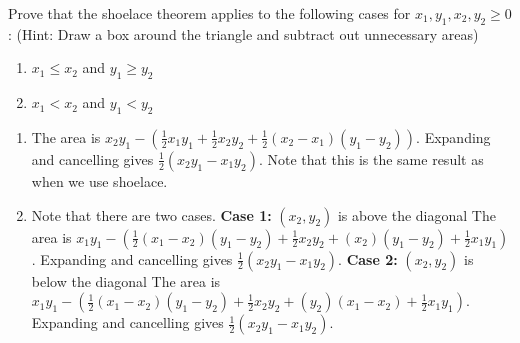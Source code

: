 \documentclass[11pt]{article}
\begin{document}
\begin{problem} \normalfont Prove that the shoelace theorem applies to the following cases for $x_1, y_1, x_2, y_2 \geq 0$: (Hint: Draw a box around the triangle and subtract out unnecessary areas)
\end{problem}
\phantom{blahbity blah} 
\begin{multicols}{2}
\begin{enumerate}[label=(\alph*)]
\item $x_1 \leq x_2$ and $y_1 \geq y_2$
    \newline
\item $x_1 < x_2$ and $y_1 < y_2$
    \newline
\end{enumerate}
\end{multicols}

\begin{solution}
\begin{enumerate}[label=(\alph*)]
\phantom{hello what's up}
\item The area is $x_2y_1 - (\frac{1}{2}x_1y_1+\frac{1}{2}x_2y_2+\frac{1}{2}(x_2-x_1)(y_1-y_2))$.
Expanding and cancelling gives $\frac{1}{2}(x_2y_1-x_1y_2)$. Note that this is the same result as when we use shoelace.

\item Note that there are two cases. 
\newline \textbf{Case 1:} $(x_2, y_2)$ is above the diagonal
The area is $x_1y_1 - (\frac{1}{2}(x_1-x_2)(y_1-y_2)+\frac{1}{2}x_2y_2+(x_2)(y_1-y_2)+\frac{1}{2}x_1y_1)$.
Expanding and cancelling gives $\frac{1}{2}(x_2y_1-x_1y_2)$. 
\newline \textbf{Case 2:} $(x_2, y_2)$ is below the diagonal
The area is $x_1y_1 - (\frac{1}{2}(x_1-x_2)(y_1-y_2)+\frac{1}{2}x_2y_2+(y_2)(x_1-x_2)+\frac{1}{2}x_1y_1)$.
Expanding and cancelling gives $\frac{1}{2}(x_2y_1-x_1y_2)$. 

\end{enumerate} \end{solution}
\end{document}

